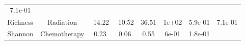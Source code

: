 \documentclass[12pt,]{article}
\begin{document}
\begin{longtable}[]{@{}cccccccc@{}}
\begin{minipage}[t]{0.08\columnwidth}
7.1e-01\strut
\end{minipage}\tabularnewline
\begin{minipage}[t]{0.12\columnwidth}\centering\strut
Richness\strut
\end{minipage} & \begin{minipage}[t]{0.11\columnwidth}\centering\strut
Radiation\strut
\end{minipage} & \begin{minipage}[t]{0.13\columnwidth}\centering\strut
-14.22\strut
\end{minipage} & \begin{minipage}[t]{0.08\columnwidth}\centering\strut
-10.52\strut
\end{minipage} & \begin{minipage}[t]{0.13\columnwidth}\centering\strut
36.51\strut
\end{minipage} & \begin{minipage}[t]{0.07\columnwidth}\centering\strut
1e+02\strut
\end{minipage} & \begin{minipage}[t]{0.06\columnwidth}\centering\strut
5.9e-01\strut
\end{minipage} & \begin{minipage}[t]{0.08\columnwidth}\centering\strut
7.1e-01\strut
\end{minipage}\tabularnewline
\begin{minipage}[t]{0.12\columnwidth}\centering\strut
Shannon\strut
\end{minipage} & \begin{minipage}[t]{0.11\columnwidth}\centering\strut
Chemotherapy\strut
\end{minipage} & \begin{minipage}[t]{0.13\columnwidth}\centering\strut
0.23\strut
\end{minipage} & \begin{minipage}[t]{0.08\columnwidth}\centering\strut
0.06\strut
\end{minipage} & \begin{minipage}[t]{0.13\columnwidth}\centering\strut
0.55\strut
\end{minipage} & \begin{minipage}[t]{0.07\columnwidth}\centering\strut
6e-01\strut
\end{minipage} & \begin{minipage}[t]{0.06\columnwidth}\centering\strut
1.8e-01\strut
\end{minipage} & \begin{minipage}[t]{0.08\columnwidth}\centering\strut

\end{minipage}
\end{longtable}
\end{document}
